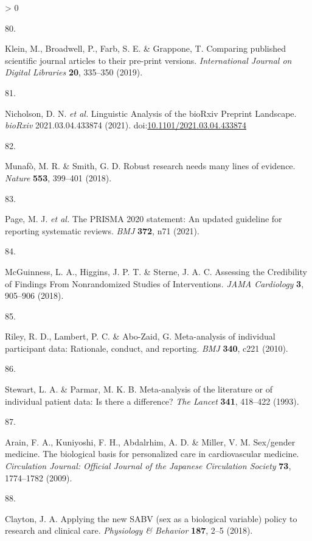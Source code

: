 \documentclass[a4paper, twoside]{templates/ociamthesis}
\newlength{\cslhangindent}
\newlength{\csllabelwidth}
\newenvironment{CSLReferences}[3] %
 {%
  \setlength{\parindent}{0pt}
  \ifodd #1 \everypar{\setlength{\hangindent}{\cslhangindent}}\ignorespaces\fi
  \ifnum #2 > 0
  \setlength{\parskip}{#2\baselineskip}
  \fi
 }%
 {}
\newcommand{\CSLLeftMargin}[1]{\parbox[t]{\maxof{\widthof{#1}}{\csllabelwidth}}{#1}}
\newcommand{\CSLRightInline}[1]{\parbox[t]{\linewidth - \csllabelwidth}{#1}}
\begin{document}
\begin{CSLReferences}{0}{0}
\leavevmode\hypertarget{ref-klein2019}{}%
\CSLLeftMargin{80. }
\CSLRightInline{Klein, M., Broadwell, P., Farb, S. E. \& Grappone, T. Comparing published scientific journal articles to their pre-print versions. \emph{International Journal on Digital Libraries} \textbf{20}, 335--350 (2019).}

\leavevmode\hypertarget{ref-nicholson2021}{}%
\CSLLeftMargin{81. }
\CSLRightInline{Nicholson, D. N. \emph{et al.} Linguistic {Analysis} of the {bioRxiv Preprint Landscape}. \emph{bioRxiv} 2021.03.04.433874 (2021). doi:\href{https://doi.org/10.1101/2021.03.04.433874}{10.1101/2021.03.04.433874}}

\leavevmode\hypertarget{ref-munafo2018}{}%
\CSLLeftMargin{82. }
\CSLRightInline{Munafò, M. R. \& Smith, G. D. Robust research needs many lines of evidence. \emph{Nature} \textbf{553}, 399--401 (2018).}

\leavevmode\hypertarget{ref-page2021}{}%
\CSLLeftMargin{83. }
\CSLRightInline{Page, M. J. \emph{et al.} The {PRISMA} 2020 statement: An updated guideline for reporting systematic reviews. \emph{BMJ} \textbf{372}, n71 (2021).}

\leavevmode\hypertarget{ref-mcguinness2018}{}%
\CSLLeftMargin{84. }
\CSLRightInline{McGuinness, L. A., Higgins, J. P. T. \& Sterne, J. A. C. Assessing the {Credibility} of {Findings From Nonrandomized Studies} of {Interventions}. \emph{JAMA Cardiology} \textbf{3}, 905--906 (2018).}

\leavevmode\hypertarget{ref-riley2010}{}%
\CSLLeftMargin{85. }
\CSLRightInline{Riley, R. D., Lambert, P. C. \& Abo-Zaid, G. Meta-analysis of individual participant data: Rationale, conduct, and reporting. \emph{BMJ} \textbf{340}, c221 (2010).}

\leavevmode\hypertarget{ref-stewart1993}{}%
\CSLLeftMargin{86. }
\CSLRightInline{Stewart, L. A. \& Parmar, M. K. B. Meta-analysis of the literature or of individual patient data: Is there a difference? \emph{The Lancet} \textbf{341}, 418--422 (1993).}

\leavevmode\hypertarget{ref-arain2009}{}%
\CSLLeftMargin{87. }
\CSLRightInline{Arain, F. A., Kuniyoshi, F. H., Abdalrhim, A. D. \& Miller, V. M. Sex/gender medicine. {The} biological basis for personalized care in cardiovascular medicine. \emph{Circulation Journal: Official Journal of the Japanese Circulation Society} \textbf{73}, 1774--1782 (2009).}

\leavevmode\hypertarget{ref-clayton2018}{}%
\CSLLeftMargin{88. }
\CSLRightInline{Clayton, J. A. Applying the new {SABV} (sex as a biological variable) policy to research and clinical care. \emph{Physiology \& Behavior} \textbf{187}, 2--5 (2018).}


\end{CSLReferences}
\end{document}

